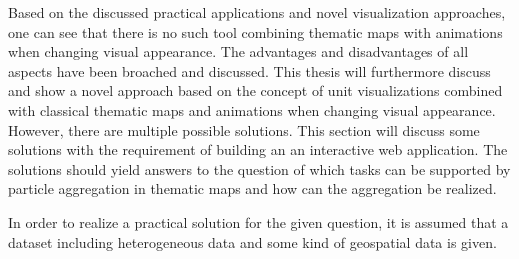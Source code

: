 Based on the discussed practical applications and novel visualization approaches, one can see that there is no such tool combining thematic maps with animations when changing visual appearance. The advantages and disadvantages of all aspects have been broached and discussed. This thesis will furthermore discuss and show a novel approach based on the concept of unit visualizations combined with classical thematic maps and animations when changing visual appearance. However, there are multiple possible solutions. This section will discuss some solutions with the requirement of building an an interactive web application. The solutions should yield answers to the question of which tasks can be supported by particle aggregation in thematic maps and how can the aggregation be realized.

In order to realize a practical solution for the given question, it is assumed that a dataset including heterogeneous data and some kind of geospatial data is given.

